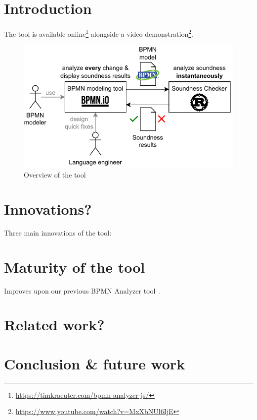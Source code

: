 \documentclass[
twocolumn,
]{ceurart}
\begin{document}
\section{Introduction}
The tool is available online\footnote{\url{https://timkraeuter.com/bpmn-analyzer-js/}} alongside a video demonstration\footnote{\url{https://www.youtube.com/watch?v=MxXbNUl6IjE}}.

\begin{figure}[ht]
	\centering
	\includegraphics[width=\linewidth]{images/overview}
	\caption{Overview of the tool}
	\label{fig:overview}
\end{figure}

\section{Innovations?} %
Three main innovations of the tool:

\section{Maturity of the tool}
Improves upon our previous BPMN Analyzer tool~\cite{krauterFormalizationAnalysisBPMN2023}.



\section{Related work?}

\section{Conclusion \& future work}



\end{document}
